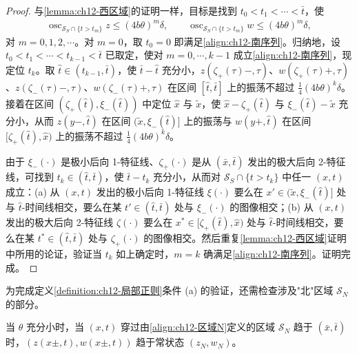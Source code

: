 \documentclass[../../main.tex]{subfiles}
\begin{document}
\begin{proof}
与\cref{lemma:ch12-西区域}的证明一样，目标是找到 $t_0<t_1<\cdots<\bar t$，使
\begin{align}
\operatorname{osc}_{\mathscr{S}_S\cap\{t>t_m\}}z\leqslant(4b\theta)^m\delta,\qquad
\operatorname{osc}_{\mathscr{S}_S\cap\{t>t_m\}}w\leqslant(4b\theta)^m\delta,
\label{align:ch12-南序列}
\end{align}
对 $m=0,1,2,\cdots$。对 $m=0$，取 $t_0=0$ 即满足\eqref{align:ch12-南序列}。归纳地，设 $t_0<t_1<\cdots<t_{k-1}<\bar t$ 已取定，使对 $m=0,\cdots,k-1$ 成立\eqref{align:ch12-南序列}，现定位 $t_k$。取 $\hat t\in(t_{k-1},\bar t)$，使 $\bar t-\hat t$ 充分小，$z(\zeta_+(\tau)-,\tau)$、$w(\zeta_+(\tau)+,\tau)$、$z(\zeta_-(\tau)-,\tau)$、$w(\zeta_-(\tau)+,\tau)$ 在区间 $[\hat t,\bar t]$ 上的振荡不超过 $\frac14(4b\theta)^k\delta$。接着在区间 $(\zeta_+(\hat t),\xi_-(\hat t))$ 中定位 $\hat x$ 与 $\tilde x$，使 $\hat x-\zeta_+(\hat t)$ 与 $\xi_-(\hat t)-\tilde x$ 充分小，从而 $z(y-,\hat t)$ 在区间 $(\tilde x,\xi_-(\hat t)]$ 上的振荡与 $w(y+,\hat t)$ 在区间 $[\zeta_+(\hat t),\hat x)$ 上的振荡不超过 $\frac14(4b\theta)^k\delta$。

由于 $\xi_-(\cdot)$ 是极小后向 1-特征线、$\zeta_+(\cdot)$ 是从 $(\bar x,\bar t)$ 发出的极大后向 2-特征线，可找到 $t_k\in(\hat t,\bar t)$，使 $\bar t-t_k$ 充分小，从而对 $\mathscr{S}_S\cap\{t>t_k\}$ 中任一 $(x,t)$ 成立：(a) 从 $(x,t)$ 发出的极小后向 1-特征线 $\xi(\cdot)$ 要么在 $x'\in(\tilde x,\xi_-(\hat t)]$ 处与 $\hat t$-时间线相交，要么在某 $t'\in(\hat t,\bar t)$ 处与 $\xi_-(\cdot)$ 的图像相交；(b) 从 $(x,t)$ 发出的极大后向 2-特征线 $\zeta(\cdot)$ 要么在 $x^*\in[\zeta_+(\hat t),\hat x)$ 处与 $\hat t$-时间线相交，要么在某 $t^*\in(\hat t,\bar t)$ 处与 $\zeta_+(\cdot)$ 的图像相交。然后重复\cref{lemma:ch12-西区域}证明中所用的论证，验证当 $t_k$ 如上确定时，$m=k$ 确满足\eqref{align:ch12-南序列}。证明完成。
\end{proof}

为完成定义\cref{definition:ch12-局部正则}条件 (a) 的验证，还需检查涉及"北"区域 $\mathscr{S}_N$ 的部分。

\begin{lemma}\label{lemma:ch12-北区域}
当 $\theta$ 充分小时，当 $(x,t)$ 穿过由\eqref{align:ch12-区域N}定义的区域 $\mathscr{S}_N$ 趋于 $(\bar x,\bar t)$ 时，$(z(x\pm,t),w(x\pm,t))$ 趋于常状态 $(z_N,w_N)$。
\end{lemma}
\end{document}

